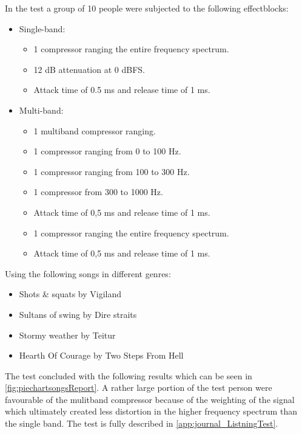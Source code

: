 In the test a group of 10 people were subjected to the following effectblocks:
 \begin{itemize}
    \item Single-band:
    \begin{itemize}
    \item 1 compressor ranging the entire frequency spectrum.
    \item 12 dB attenuation at 0 dBFS. 
    \item Attack time of 0.5 ms and release time of 1 ms.
    \end{itemize}
    \item Multi-band:
    \begin{itemize}
    \item 1 multiband compressor ranging.
    \item 1 compressor ranging from 0 to 100 Hz.
    \item 1 compressor ranging from 100 to 300 Hz.
    \item 1 compressor from 300 to 1000 Hz.
    \item Attack time of 0,5 ms and release time of 1 ms.
    \item 1 compressor ranging the entire frequency spectrum.
    \item Attack time of 0,5 ms and release time of 1 ms.
    \end{itemize}
 \end{itemize}
Using the following songs in different genres:
\begin{itemize}
\item Shots \& squats by Vigiland
\item Sultans of swing by Dire straits
\item Stormy weather by Teitur
\item Hearth Of Courage by Two Steps From Hell
\end{itemize}
The test concluded with the following results which can be seen in \autoref{fig:piechartsongsReport}. A rather large portion of the test person were favourable of the mulitband compressor because of the weighting of the signal which ultimately created less distortion in the higher frequency spectrum than the single band. The test is fully described in \autoref{app:journal_ListningTest}.

